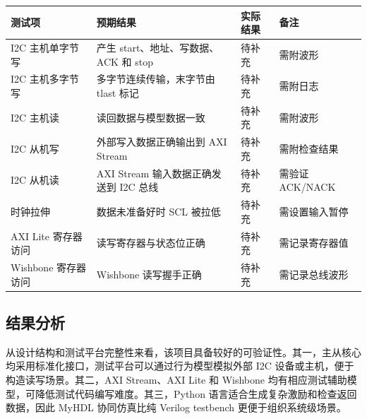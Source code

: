 \documentclass[12pt,a4paper]{article}
\numberwithin{equation}{section}
\begin{document}
\begin{longtable}[]{@{}
  >{\raggedright\arraybackslash}p{}
  >{\raggedright\arraybackslash}p{}
  >{\raggedright\arraybackslash}p{}
  >{\raggedright\arraybackslash}p{}@{}}
\toprule\noalign{}
\begin{minipage}[b]{\linewidth}\raggedright
测试项
\end{minipage} & \begin{minipage}[b]{\linewidth}\raggedright
预期结果
\end{minipage} & \begin{minipage}[b]{\linewidth}\raggedright
实际结果
\end{minipage} & \begin{minipage}[b]{\linewidth}\raggedright
备注
\end{minipage} \\
\midrule\noalign{}
\endhead
\bottomrule\noalign{}
\endlastfoot
I2C 主机单字节写 & 产生 start、地址、写数据、ACK 和 stop & 待补充 &
需附波形 \\
I2C 主机多字节写 & 多字节连续传输，末字节由 tlast 标记 & 待补充 &
需附日志 \\
I2C 主机读 & 读回数据与模型数据一致 & 待补充 & 需附波形 \\
I2C 从机写 & 外部写入数据正确输出到 AXI Stream & 待补充 &
需附检查结果 \\
I2C 从机读 & AXI Stream 输入数据正确发送到 I2C 总线 & 待补充 & 需验证
ACK/NACK \\
时钟拉伸 & 数据未准备好时 SCL 被拉低 & 待补充 & 需设置输入暂停 \\
AXI Lite 寄存器访问 & 读写寄存器与状态位正确 & 待补充 &
需记录寄存器值 \\
Wishbone 寄存器访问 & Wishbone 读写握手正确 & 待补充 & 需记录总线波形 \\
\end{longtable}

\subsection{结果分析}\label{ux7ed3ux679cux5206ux6790}

从设计结构和测试平台完整性来看，该项目具备较好的可验证性。其一，主从核心均采用标准化接口，测试平台可以通过行为模型模拟外部
I2C 设备或主机，便于构造读写场景。其二，AXI Stream、AXI Lite 和 Wishbone
均有相应测试辅助模型，可降低测试代码编写难度。其三，Python
语言适合生成复杂激励和检查返回数据，因此 MyHDL 协同仿真比纯 Verilog
testbench 更便于组织系统级场景。
\end{document}
